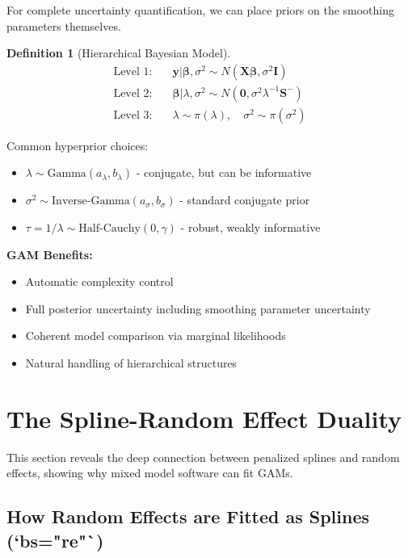 \documentclass[12pt]{article}
\newtheorem{definition}{Definition}
\begin{document}
For complete uncertainty quantification, we can place priors on the smoothing parameters themselves.

\begin{definition}[Hierarchical Bayesian Model]
\begin{align}
\text{Level 1:} \quad & \mathbf{y} | \bm{\beta}, \sigma^2 \sim N(\mathbf{X}\bm{\beta}, \sigma^2\mathbf{I}) \\
\text{Level 2:} \quad & \bm{\beta} | \lambda, \sigma^2 \sim N(\mathbf{0}, \sigma^2\lambda^{-1}\mathbf{S}^{-}) \\
\text{Level 3:} \quad & \lambda \sim \pi(\lambda), \quad \sigma^2 \sim \pi(\sigma^2)
\end{align}
\end{definition}

Common hyperprior choices:
\begin{itemize}
    \item $\lambda \sim \text{Gamma}(a_\lambda, b_\lambda)$ - conjugate, but can be informative
    \item $\sigma^2 \sim \text{Inverse-Gamma}(a_\sigma, b_\sigma)$ - standard conjugate prior
    \item $\tau = 1/\lambda \sim \text{Half-Cauchy}(0, \gamma)$ - robust, weakly informative
\end{itemize}

\textbf{GAM Benefits:}
\begin{itemize}
    \item Automatic complexity control
    \item Full posterior uncertainty including smoothing parameter uncertainty
    \item Coherent model comparison via marginal likelihoods
    \item Natural handling of hierarchical structures
\end{itemize}

\section{The Spline-Random Effect Duality}

This section reveals the deep connection between penalized splines and random effects, showing why mixed model software can fit GAMs.

\subsection{How Random Effects are Fitted as Splines (`bs="re"`)}
\end{document}
